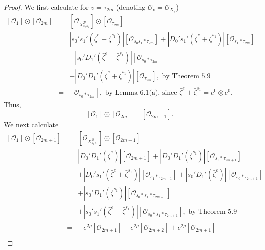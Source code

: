 \documentclass{article}
\def\B{\mathcal{B}}
\def\ref#1{#1}
\begin{document}
\begin{proof}
We first calculate for $v=\tau_{2m}$ (denoting $\mathcal{O}_v=\mathcal{O}_{X_v}$)
\begin{eqnarray*}
\left[ \mathcal{O}_{1}\right] \odot \left[ \mathcal{O}_{2m}\right]&=& \left[ \mathcal{O}_{X_{s_0s_1}^\B}\right] \odot \left[ \mathcal{O}_{\tau_{2m}}\right]\\
&=& \left\vert s_0's_1'\left( \bar{\zeta}^e+\bar{\zeta}^{s_1}\right) \right\vert \left[\mathcal{O}_{s_0s_1*\tau_{2m}}\right]
+ \left\vert D_0's_1' \left(\bar{\zeta}^e+\bar{\zeta}^{s_1}\right) \right\vert \left[\mathcal{O}_{s_1*\tau_{2m}}\right]\\
&&+ \left\vert s_0'D_1' \left(\bar{\zeta}^e+\bar{\zeta}^{s_1}\right) \right\vert \left[\mathcal{O}_{s_0*\tau_{2m}}\right]\\
&&+ \left\vert D_0'D_1' \left(\bar{\zeta}^e+\bar{\zeta}^{s_1}\right) \right\vert \left[\mathcal{O}_{\tau_{2m}}\right],\mbox{ by Theorem \ref{5.9}}\\
&=&  \left[\mathcal{O}_{s_0*\tau_{2m}}\right],\mbox{ by Lemma \ref{6.1}(a), since } \bar{\zeta}^e+\bar{\zeta}^{s_1}= e^0\otimes e^0. 
\end{eqnarray*}
Thus, 
\begin{equation}\label{6.3.1}
\left[ \mathcal{O}_{1}\right] \odot \left[ \mathcal{O}_{2m}\right] = \left[ \mathcal{O}_{2m+1}\right].
\end{equation}
We next calculate  
\begin{eqnarray*}
\left[ \mathcal{O}_{1}\right] \odot \left[ \mathcal{O}_{2m+1}\right] &=& \left[ \mathcal{O}_{X_{s_0s_1}^\B}\right] \odot \left[ \mathcal{O}_{2m+1}\right] \\
&=&  \left\vert D_0'D_1' \left(\bar{\zeta}^e\right) \right\vert \left[\mathcal{O}_{2m+1}\right]+  \left\vert D_0'D_1' \left(\bar{\zeta}^{s_1}\right) \right\vert \left[\mathcal{O}_{s_1*\tau_{2m+1}}\right]\\
&&+ \left\vert D_0's_1' \left(\bar{\zeta}^e+\bar{\zeta}^{s_1}\right) \right\vert \left[\mathcal{O}_{s_1*\tau_{2m+1}}\right]+\left\vert s_0'D_1'(\bar{\zeta}^e)\right\vert \left[\mathcal{O}_{s_0*\tau_{2m+1}}\right]\\
&&+ \left\vert s_0'D_1' (\bar{\zeta}^{s_1}) \right\vert \left[\mathcal{O}_{s_0*s_1*\tau_{2m+1}}\right]\\
&&+\left\vert s_0's_1'\left(\bar{\zeta}^e+\bar{\zeta}^{s_1}\right) \right\vert \left[\mathcal{O}_{s_0*s_1*\tau_{2m+1}}\right],\mbox{ by Theorem \ref{5.9}}\\
&=& -e^{2\rho} \left[\mathcal{O}_{2m+1}\right] +e^{2\rho} \left[\mathcal{O}_{2m+2}\right] + e^{2\rho} \left[\mathcal{O}_{2m+1}\right] \\

\end{eqnarray*}
\end{proof}
\end{document}
